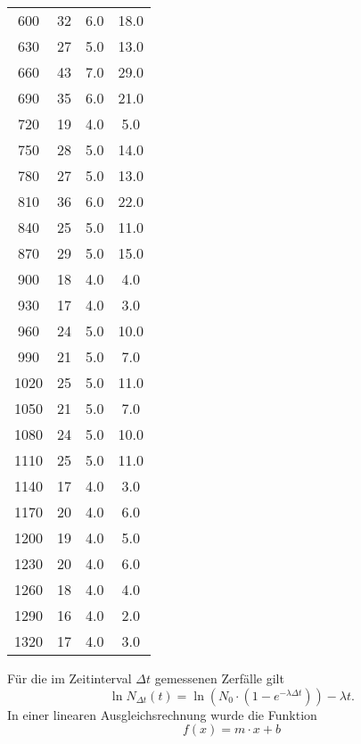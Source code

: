 \begin{longtable}{c c c c}
		 600   	&       32  	&  6.0 &       18.0 \\
		 630   	&       27  	&  5.0 &       13.0 \\
		 660   	&       43  	&  7.0 &       29.0 \\
		 690   	&       35  	&  6.0 &       21.0 \\
		 720   	&       19  	&  4.0 &        5.0 \\
		 750   	&       28  	&  5.0 &       14.0 \\
		 780   	&       27  	&  5.0 &       13.0 \\
		 810   	&       36  	&  6.0 &       22.0 \\
		 840   	&       25  	&  5.0 &       11.0 \\
		 870   	&       29  	&  5.0 &       15.0 \\
		 900   	&       18  	&  4.0 &        4.0 \\
		 930   	&       17  	&  4.0 &        3.0 \\
		 960   	&       24  	&  5.0 &       10.0 \\
		 990   	&       21  	&  5.0 &        7.0 \\
		1020   	&       25  	&  5.0 &       11.0 \\
		1050   	&       21  	&  5.0 &        7.0 \\
		1080   	&       24  	&  5.0 &       10.0 \\
		1110   	&       25  	&  5.0 &       11.0 \\
		1140   	&       17  	&  4.0 &        3.0 \\
		1170   	&       20  	&  4.0 &        6.0 \\
		1200   	&       19  	&  4.0 &        5.0 \\
		1230   	&       20  	&  4.0 &        6.0 \\
		1260   	&       18  	&  4.0 &        4.0 \\
		1290   	&       16  	&  4.0 &        2.0 \\
		1320   	&       17  	&  4.0 &        3.0 \\
\end{longtable}
\noindent
Für die im Zeitinterval $\Delta t$ gemessenen Zerfälle gilt
\begin{equation}
	\ln N_{\Delta t}(t) = \ln\left( N_0 \cdot \left(1 - e^{-\lambda \Delta t}\right) \right) - \lambda t.
	\label{eqn:logarithmisch}
\end{equation}
\noindent
In einer linearen Ausgleichsrechnung wurde die Funktion 
\begin{equation}
	f(x) = m \cdot x + b
	\label{eqn:mx+b}
\end{equation}
